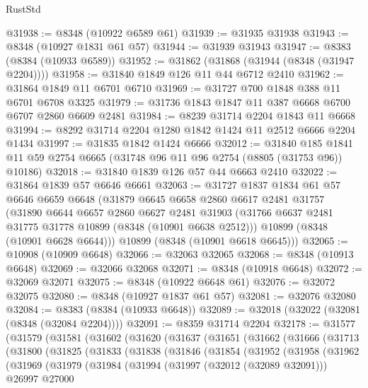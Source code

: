 \begin{lexlean}{RustStd}
\begin{coremodule}
@31938 := @8348 (@10922 @6589 @61)
@31939 := @31935 @31938
@31943 := @8348 (@10927 @1831 @61 @57)
@31944 := @31939 @31943
@31947 := @8383 (@8384 (@10933 @6589))
@31952 := @31862 (@31868 (@31944 (@8348 (@31947 @2204))))
@31958 := @31840 @1849 @126 @11 @44 @6712 @2410
@31962 := @31864 @1849 @11 @6701 @6710
@31969 := @31727 @700 @1848 @388 @11 @6701 @6708 @3325
@31979 := @31736 @1843 @1847 @11 @387 @6668 @6700 @6707 @2860 @6609 @2481
@31984 := @8239 @31714 @2204 @1843 @11 @6668
@31994 := @8292 @31714 @2204 @1280 @1842 @1424 @11 @2512 @6666 @2204 @1434
@31997 := @31835 @1842 @1424 @6666
@32012 := @31840
    @185
    @1841
    @11
    @59
    @2754
    @6665
    (@31748 @96 @11 @96 @2754 (@8805 (@31753 @96)) @10186)
@32018 := @31840 @1839 @126 @57 @44 @6663 @2410
@32022 := @31864 @1839 @57 @6646 @6661
@32063 := @31727
    @1837
    @1834
    @61
    @57
    @6646
    @6659
    @6648
    (@31879
      @6645
      @6658
      @2860
      @6617
      @2481
      @31757
      (@31890
        @6644
        @6657
        @2860
        @6627
        @2481
        @31903
        (@31766 @6637 @2481 @31775 @31778 @10899 (@8348 (@10901 @6638 @2512)))
        @10899
        (@8348 (@10901 @6628 @6644)))
      @10899
      (@8348 (@10901 @6618 @6645)))
@32065 := @10908 (@10909 @6648)
@32066 := @32063 @32065
@32068 := @8348 (@10913 @6648)
@32069 := @32066 @32068
@32071 := @8348 (@10918 @6648)
@32072 := @32069 @32071
@32075 := @8348 (@10922 @6648 @61)
@32076 := @32072 @32075
@32080 := @8348 (@10927 @1837 @61 @57)
@32081 := @32076 @32080
@32084 := @8383 (@8384 (@10933 @6648))
@32089 := @32018 (@32022 (@32081 (@8348 (@32084 @2204))))
@32091 := @8359 @31714 @2204
@32178 := @31577
    (@31579
      (@31581
        (@31602
          (@31620
            (@31637
              (@31651
                (@31662
                  (@31666
                    (@31713
                      (@31800
                        (@31825
                          (@31833
                            (@31838
                              (@31846
                                (@31854
                                  (@31952
                                    (@31958
                                      (@31962
                                        (@31969
                                          (@31979
                                            (@31984
                                              (@31994
                                                (@31997 (@32012 (@32089 @32091)))
                                                @26997
                                                @27000

\end{coremodule}
\end{lexlean}
